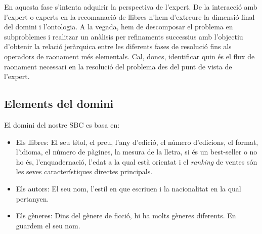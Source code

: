 
En aquesta fase s'intenta adquirir la perspectiva de l'expert. De la interacció amb l'expert o experts en la recomanació de llibres n'hem d'extreure la dimensió final del domini i l'ontologia. A  la vegada, hem de descomposar el problema en subproblemes i realitzar un anàlisis per refinaments successius amb l'objectiu d'obtenir la relació jeràrquica entre les diferents fases de resolució fins als operadors de raonament més elementals. Cal, doncs, identificar quin és el flux de raonament necessari en la resolució del problema des del punt de vista de l'expert.

\subsection{Elements del domini}

El domini del nostre SBC es basa en:

\begin{itemize}
\item Els llibres: El seu títol, el preu, l'any d'edició, el número d'edicions, el format, l'idioma, el número de pàgines, la mesura de la lletra, si és un best-seller o no ho és, l'enquadernació, l'edat a la qual està orientat i el \emph{ranking} de ventes són les seves característiques directes principals.
\item Els autors: El seu nom, l'estil en que escriuen i la nacionalitat en la qual pertanyen.
\item Els gèneres: Dins del gènere de ficció, hi ha molts gèneres diferents. En guardem el seu nom.
\end{itemize}